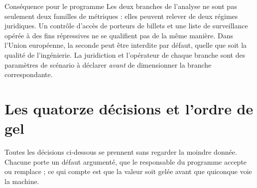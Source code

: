 \documentclass[11pt,a4paper]{article}
\begin{document}
\begin{alerte}{Conséquence pour le programme}
Les deux branches de l'analyse ne sont pas seulement deux familles de métriques : elles
peuvent relever de deux régimes juridiques. Un contrôle d'accès de porteurs de billets
et une liste de surveillance opérée à des fins répressives ne se qualifient pas de la
même manière. Dans l'Union européenne, la seconde peut être interdite par défaut,
quelle que soit la qualité de l'ingénierie. La juridiction et l'opérateur de chaque
branche sont des paramètres de scénario à déclarer \emph{avant} de dimensionner la
branche correspondante.
\end{alerte}

\section{Les quatorze décisions et l'ordre de gel}\label{sec:decisions}

Toutes les décisions ci-dessous se prennent sans regarder la moindre donnée. Chacune
porte un défaut argumenté, que le responsable du programme accepte ou remplace ; ce qui
compte est que la valeur soit gelée avant que quiconque voie la machine.
\end{document}
